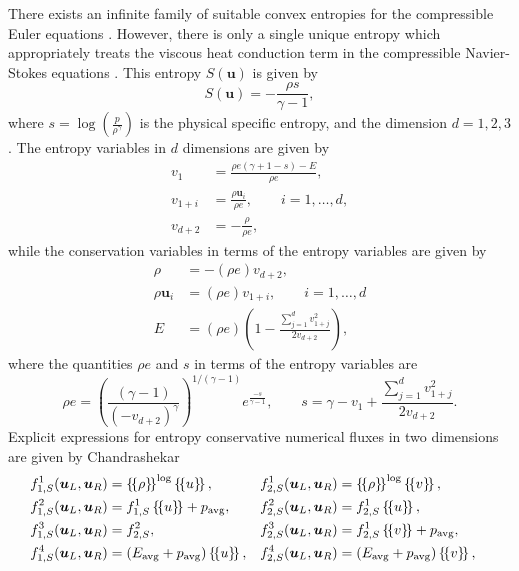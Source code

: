 \documentclass[onefignum,onetabnum,final]{siamart171218}
\newcommand{\LRp}[1]{\left( #1 \right)}
\newcommand{\LRc}[1]{\left\{ #1 \right\}}
\newcommand{\avg}[1] {\ensuremath{\LRc{\!\{#1\}\!}}}
\begin{document}
There exists an infinite family of suitable convex entropies for the compressible Euler equations \cite{harten1983symmetric}.  However, there is only a single unique entropy which appropriately treats the viscous heat conduction term in the compressible Navier-Stokes equations \cite{hughes1986new}.  This entropy $S(\bm{u})$ is given by
\begin{equation*}
S(\bm{u}) = -\frac{\rho s}{\gamma-1}, 
\end{equation*}
where $s = \log\LRp{\frac{p}{\rho^\gamma}}$ is the physical specific entropy, and the dimension $d = 1,2,3$.  The entropy variables in $d$ dimensions are given by
\begin{align*}
v_1 &= \frac{\rho e (\gamma + 1 - s) - E}{\rho e}, \\
v_{1+ i}&= \frac{\rho \bm{u}_i}{\rho e}, \qquad i = 1,\ldots, d,\\
v_{d+2} &= -\frac{\rho}{\rho e},
\end{align*}
while the conservation variables in terms of the entropy variables are given by
\begin{align*}
\rho &= -(\rho e) v_{d+2}, \\
 \rho \bm{u}_i &= (\rho e) v_{1+i}, \qquad i = 1,\ldots,d\\
 E &= (\rho e)\LRp{1 - \frac{\sum_{j=1}^d{v_{1+j}^2}}{2 v_{d+2}}},
\end{align*}
where the quantities $\rho e$ and $s$ in terms of the entropy variables are 
\begin{equation*}
\rho e = \LRp{\frac{(\gamma-1)}{\LRp{-v_{d+2}}^{\gamma}}}^{1/(\gamma-1)}e^{\frac{-s}{\gamma-1}}, \qquad s = \gamma - v_1 + \frac{\sum_{j=1}^d{v_{1+j}^2}}{2v_{d+2}}.
\end{equation*}
Explicit expressions for entropy conservative numerical fluxes in two dimensions  are given by Chandrashekar \cite{chandrashekar2013kinetic}
\begin{align*}
&f^1_{1,S}(\bm{u}_L,\bm{u}_R) = \avg{\rho}^{\log} \avg{u},& &f^1_{2,S}(\bm{u}_L,\bm{u}_R) = \avg{\rho}^{\log} \avg{v},&\\
&f^2_{1,S}(\bm{u}_L,\bm{u}_R) = f^1_{1,S} \avg{u} + p_{\rm avg},&  &f^2_{2,S}(\bm{u}_L,\bm{u}_R) = f^1_{2,S} \avg{u},&\nonumber\\
&f^3_{1,S}(\bm{u}_L,\bm{u}_R) = f^2_{2,S},& &f^3_{2,S}(\bm{u}_L,\bm{u}_R) = f^1_{2,S} \avg{v} + p_{\rm avg},&\nonumber\\
&f^4_{1,S}(\bm{u}_L,\bm{u}_R) = \LRp{E_{\rm avg} + p_{\rm avg}}\avg{u},& &f^4_{2,S}(\bm{u}_L,\bm{u}_R) = \LRp{E_{\rm avg} + p_{\rm avg} }\avg{v},& \nonumber
\end{align*}
\end{document}
